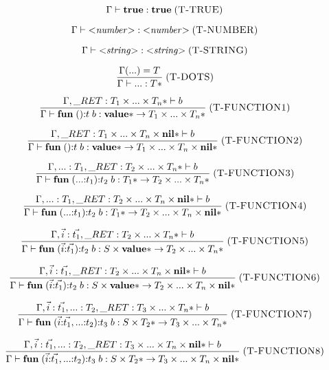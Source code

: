 \documentclass[12pt]{article}
\newcommand{\Top}{\mathbf{value}}
\newcommand{\Nil}{\mathbf{nil}}
\newcommand{\True}{\mathbf{true}}
\newcommand{\kw}[1]{\mathbf{#1}}
\newcommand{\mylabel}[1]{\; (\textsc{#1})}
\newcommand{\env}{\Gamma}
\newcommand{\ret}{\string_RET}
\begin{document}
\[
\env \vdash \kw{true} : \True
\mylabel{T-TRUE}
\]

\[
\env \vdash {<}{\it number}{>} : {<}{\it number}{>}
\mylabel{T-NUMBER}
\]

\[
\env \vdash {<}{\it string}{>} : {<}{\it string}{>}
\mylabel{T-STRING}
\]

\[
\frac{\env({...}) = T}
     {\env \vdash {...} : T{*}}
\mylabel{T-DOTS}
\]

\[
\frac{\env, \ret:T_{1} \times ... \times T_{n}* \vdash b}
     {\env \vdash \kw{fun} \; (){:}t \; b :
      \Top{*} \rightarrow T_{1} \times ... \times T_{n}*}
\mylabel{T-FUNCTION1}
\]

\[
\frac{\env, \ret:T_{1} \times ... \times T_{n} \times \Nil{*} \vdash b}
     {\env \vdash \kw{fun} \; (){:}t \; b :
      \Top{*} \rightarrow T_{1} \times ... \times T_{n} \times \Nil{*}}
\mylabel{T-FUNCTION2}
\]

\[
\frac{\env, {...}:T_{1}, \ret:T_{2} \times ... \times T_{n}* \vdash b}
     {\env \vdash \kw{fun} \; ({...}{:}t_{1}){:}t_{2} \; b :
      T_{1}{*} \rightarrow T_{2} \times ... \times T_{n}*}
\mylabel{T-FUNCTION3}
\]

\[
\frac{\env, {...}:T_{1}, \ret:T_{2} \times ... \times T_{n} \times \Nil{*} \vdash b}
     {\env \vdash \kw{fun} \; ({...}{:}t_{1}){:}t_{2} \; b :
      T_{1}{*} \rightarrow T_{2} \times ... \times T_{n} \times \Nil{*}}
\mylabel{T-FUNCTION4}
\]

\[
\frac{\env, \vec{i}:\vec{t_{1}},
      \ret:T_{2} \times ... \times T_{n}* \vdash b}
     {\env \vdash \kw{fun} \; (\vec{i}{:}\vec{t_{1}}){:}t_{2} \; b :
      S \times \Top{*} \rightarrow T_{2} \times ... \times T_{n}*}
\mylabel{T-FUNCTION5}
\]

\[
\frac{\env, \vec{i}:\vec{t_{1}},
      \ret:T_{2} \times ... \times T_{n} \times \Nil{*} \vdash b}
     {\env \vdash \kw{fun} \; (\vec{i}{:}\vec{t_{1}}){:}t_{2} \; b :
      S \times \Top{*} \rightarrow T_{2} \times ... \times T_{n} \times \Nil{*}}
\mylabel{T-FUNCTION6}
\]

\[
\frac{\env, \vec{i}:\vec{t_{1}}, {...}:T_{2},
      \ret:T_{3} \times ... \times T_{n}* \vdash b}
     {\env \vdash \kw{fun} \; (\vec{i}{:}\vec{t_{1}},{...}{:}t_{2}){:}t_{3} \; b :
      S \times T_{2}* \rightarrow T_{3} \times ... \times T_{n}*}
\mylabel{T-FUNCTION7}
\]

\[
\frac{\env, \vec{i}:\vec{t_{1}}, {...}:T_{2},
      \ret:T_{3} \times ... \times T_{n} \times \Nil{*} \vdash b}
     {\env \vdash \kw{fun} \; (\vec{i}{:}\vec{t_{1}},{...}{:}t_{2}){:}t_{3} \; b :
      S \times T_{2}* \rightarrow T_{3} \times ... \times T_{n} \times \Nil{*}}
\mylabel{T-FUNCTION8}
\]
\end{document}
